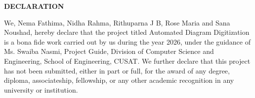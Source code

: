 \clearpage
{}
{}
\thispagestyle{footeronly}
\begin{center}
{\Large \textbf{DECLARATION}}
\end{center}

\justifying

We, Nema Fathima, Nidha Rahma, Rithuparna J B, 
Rose Maria and Sana Noushad, hereby declare that the project titled 
Automated Diagram Digitization
is a bona fide work carried out by us during the year 2026, 
under the guidance of Ms. Swaiba Nasmi, Project Guide, Division of Computer Science and Engineering, School of Engineering, CUSAT. We further declare that this project has not been submitted, either in part or full, for the award of any degree, diploma, 
associateship, fellowship, or any other academic recognition 
in any university or institution.

\vfill

\clearpage